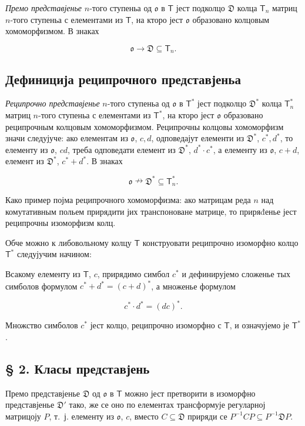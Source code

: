 \documentclass[11pt]{article}
\begin{document}
\emph{Премо представјенье} \(n\)-того ступеньа од \(\mathfrak{o}\) в \(\mathsf T\) јест подколцо \(\mathfrak D\) колца \(\mathsf T_n\) матриц \(n\)-того ступеньа с елементами из \(\mathsf T\), на кторо јест \(\mathfrak{o}\) образовано колцовым хомоморфизмом. В знаках

\[
\mathfrak{o}\to\mathfrak D\subseteq\mathsf T_n.
\]

\subsection*{Дефиниција реципрочного представјеньа}\label{definition-der-reziproken-darstellung}

\emph{Реципрочно представјенье} \(n\)-того ступеньа од \(\mathfrak{o}\) в \(\mathsf T^*\) јест подколцо \(\mathfrak D^*\) колца \(\mathsf T_n^*\) матриц \(n\)-того ступеньа с елементами из \(\mathsf T^*\), на кторо јест \(\mathfrak{o}\) образовано реципрочным колцовым хомоморфизмом. Реципрочны колцовы хомоморфизм значи следујуче: ако елементам из \(\mathfrak{o}\), \(c,d\), одповедајут елементи из \(\mathfrak D^*\), \(c^*,d^*\), то елементу из \(\mathfrak{o}\), \(cd\), треба одповедати елемент из \(\mathfrak D^*\), \(d^*\cdot c^*\), а елементу из \(\mathfrak{o}\), \(c+d\), елемент из \(\mathfrak D^*\), \(c^*+d^*\). В знаках

\[
\mathfrak{o}\nrightarrow\mathfrak D^*\subseteq\mathsf T_n^*.
\]

Како пример појма реципрочного хомоморфизма: ако матрицам реда \(n\) над комутативным польем прирядити јих транспоноване матрице, то приряđенье јест реципрочны изоморфизм колц.

Обче можно к либовольному колцу \(\mathsf T\) конструовати реципрочно изоморфно колцо \(\mathsf T^*\) следујучим начином:

Всакому елементу из \(\mathsf T\), \(c\), прирядимо симбол \(c^*\) и дефинирујемо сложенье тых симболов формулом \(c^*+d^*=(c+d)^*\), а множенье формулом

\[
c^*\cdot d^*=(dc)^*.
\]

Множство симболов \(c^*\) јест колцо, реципрочно изоморфно с \(\mathsf T\), и означујемо је \(\mathsf T^*\).

\subsection*{§ 2. Класы представјень}\label{darstellungsklassen}

Премо представјенье \(\mathfrak D\) од \(\mathfrak{o}\) в \(\mathsf T\) можно јест претворити в изоморфно представјенье \(\mathfrak D'\) тако, же се оно по елементах трансформује регуларној матрицоју \(P\), т.~ј. елементу из \(\mathfrak{o}\), \(c\), вместо \(C\subseteq\mathfrak D\) приряди се \(P^{-1}CP\subseteq P^{-1}\mathfrak D P\).
\end{document}

